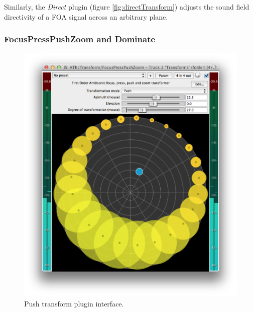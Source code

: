 \documentclass{article}
\begin{document}
Similarly, the \emph{Direct} plugin (figure \ref{fig:directTransform}) adjusts the sound field directivity of a FOA signal across an arbitrary plane.


 
\subsubsection{FocusPressPushZoom and Dominate}\label{sec:focus}

\begin{figure}[h]
\captionsetup{aboveskip=-6pt}
\centering
\includegraphics[width=0.8\columnwidth]{figures/pushTransform.png}
\setlength{\abovecaptionskip}{0pt plus 3pt minus 2pt} %
\caption{Push transform plugin interface.\label{fig:pushTransform}}
\end{figure}
\end{document}
